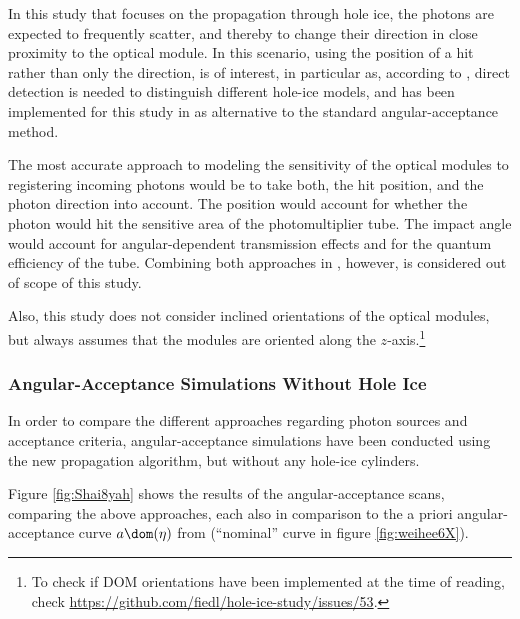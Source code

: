 In this study that focuses on the propagation through hole ice, the photons are expected to frequently scatter, and thereby to change their direction in close proximity to the optical module. In this scenario, using the position of a hit rather than only the direction, is of interest, in particular as, according to \cite{martinspicehddard}, direct detection is needed to distinguish different hole-ice models, and has been implemented for this study in \clsim as alternative to the standard angular-acceptance method.


The most accurate approach to modeling the sensitivity of the optical modules to registering incoming photons would be to take both, the hit position, and the photon direction into account. The position would account for whether the photon would hit the sensitive area of the photomultiplier tube. The impact angle would account for angular-dependent transmission effects and for the quantum efficiency of the tube. Combining both approaches in \clsim, however, is considered out of scope of this study.\followup

Also, this study does not consider inclined orientations of the optical modules, but always assumes that the modules are oriented along the $z$-axis.\footnote{To check if DOM orientations have been implemented at the time of reading, check \url{https://github.com/fiedl/hole-ice-study/issues/53}.}



\subsubsection{Angular-Acceptance Simulations Without Hole Ice}
\label{sec:angular_acceptance_simulations_without_hole_ice}

In order to compare the different approaches regarding photon sources and acceptance criteria, angular-acceptance simulations have been conducted using the new propagation algorithm, but without any hole-ice cylinders.


Figure \ref{fig:Shai8yah} shows the results of the angular-acceptance scans, comparing the above approaches, each also in comparison to the a priori angular-acceptance curve $a\dom(\eta)$ from \cite{icepaper} (``nominal'' curve in figure \ref{fig:weihee6X}).


